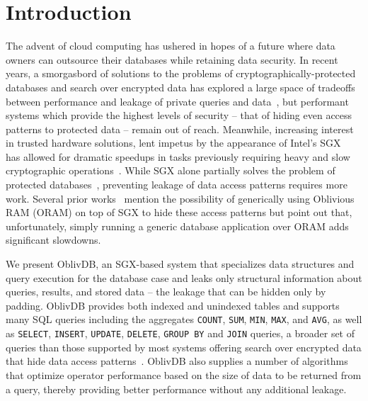 \documentclass[letterpaper,twocolumn,10pt]{article}
\def\name/{OblivDB}
\begin{document}
\section{Introduction}

The advent of cloud computing has ushered in hopes of a future where data owners can outsource their databases while retaining data security. In recent years, a smorgasbord of solutions to the problems of cryptographically-protected databases and search over encrypted data has explored a large space of tradeoffs between performance and leakage of private queries and data~\cite{FVY+17}, but performant systems which provide the highest levels of security -- that of hiding even access patterns to protected data -- remain out of reach. Meanwhile, increasing interest in trusted hardware solutions, lent impetus by the appearance of Intel's SGX~\cite{CD16} has allowed for dramatic speedups in tasks previously requiring heavy and slow cryptographic operations~\cite{FVBG16, NFR+17}. While SGX alone partially solves the problem of protected databases~\cite{FBB+17}, preventing leakage of data access patterns requires more work. Several prior works~\cite{PBP16, DPP+16, FVY+17} mention the possibility of generically using Oblivious RAM (ORAM) on top of SGX to hide these access patterns but point out that, unfortunately, simply running a generic database application over ORAM adds significant slowdowns.

We present \name/, an SGX-based system that specializes data structures and query execution for the database case and leaks only structural information about queries, results, and stored data -- the leakage that can be hidden only by padding. \name/ provides both indexed and unindexed tables and supports many SQL queries including the aggregates \texttt{COUNT}, \texttt{SUM}, \texttt{MIN}, \texttt{MAX}, and \texttt{AVG}, as well as \texttt{SELECT}, \texttt{INSERT}, \texttt{UPDATE}, \texttt{DELETE}, \texttt{GROUP BY} and \texttt{JOIN} queries, a broader set of queries than those supported by most systems offering search over encrypted data that hide data access patterns~\cite{FVY+17}. \name/ also supplies a number of algorithms that optimize operator performance based on the size of data to be returned from a query, thereby providing better performance without any additional leakage. 
\end{document}
